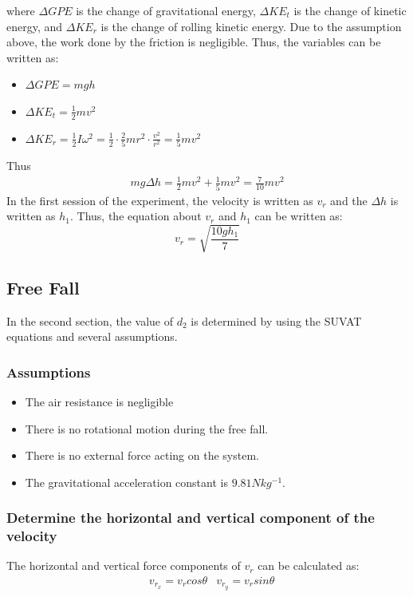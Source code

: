 \documentclass[conference]{IEEEtran}
\begin{document}
        where $\Delta GPE$ is the change of gravitational energy, $\Delta KE_t$ is the change of kinetic energy, and $\Delta KE_r$ is the change of rolling kinetic energy. Due to the assumption above, the work done by the friction is negligible. Thus, the variables can be written as:
        \begin{itemize}
            \item $\Delta GPE = mgh$ 
            \item $\Delta KE_t = \frac{1}{2}mv^2$ 
            \item $\Delta KE_r = \frac{1}{2}I\omega^2 = \frac{1}{2}\cdot \frac{2}{5}mr^2\cdot\frac{v^2}{r^2} = \frac{1}{5}mv^2$ 
        \end{itemize}
        Thus 
        \begin{equation}
            \begin{aligned}
                mg\Delta h = \frac{1}{2}mv^2 + \frac{1}{5}mv^2 = \frac{7}{10}mv^2 \nonumber
            \end{aligned}
        \end{equation}
        In the first session of the experiment, the velocity is written as $v_r$ and the $\Delta h$ is written as $h_1$. Thus, the equation about $v_r$ and $h_1$ can be written as:
        \begin{equation}\label{vr}
            v_r = \sqrt{\frac{10gh_1}{7}}
        \end{equation}
    
    \subsection{Free Fall}
    In the second section, the value of $d_2$ is determined by using the SUVAT equations and several assumptions.
        \subsubsection{Assumptions}
            \begin{itemize}
                \item The air resistance is negligible
                \item There is no rotational motion during the free fall.
                \item There is no external force acting on the system.
                \item The gravitational acceleration constant is $9.81 Nkg^{-1}$.
            \end{itemize}
        \subsubsection{Determine the horizontal and vertical component of the velocity}
            The horizontal and vertical force components of $v_r$ can be calculated as:
            \begin{equation}
                \begin{aligned}
                &v_{r_x} = v_rcos\theta  &v_{r_y} = v_rsin\theta
                \end{aligned}
            \end{equation}
\end{document}
